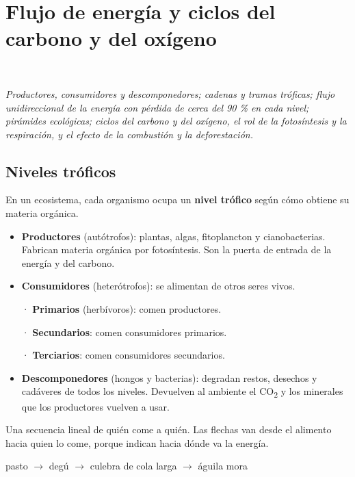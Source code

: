 \section[Flujo de energía y ciclos del carbono y del oxígeno]{Flujo de energía y ciclos del carbono y del oxígeno}
\modcomun\ \ {\color{gris}\itshape Productores, consumidores y descomponedores; cadenas y tramas tróficas; flujo unidireccional de la energía con pérdida de cerca del 90 \% en cada nivel; pirámides ecológicas; ciclos del carbono y del oxígeno, el rol de la fotosíntesis y la respiración, y el efecto de la combustión y la deforestación.\par}
\subsection{Niveles tróficos}
En un ecosistema, cada organismo ocupa un \textbf{nivel trófico} según cómo obtiene su materia orgánica.

 
\begin{itemize}
  \item \textbf{Productores} (autótrofos): plantas, algas, fitoplancton y cianobacterias. Fabrican materia orgánica por fotosíntesis. Son la puerta de entrada de la energía y del carbono.
  \item \textbf{Consumidores} (heterótrofos): se alimentan de otros seres vivos.\par · \textbf{Primarios} (herbívoros): comen productores.\par · \textbf{Secundarios}: comen consumidores primarios.\par · \textbf{Terciarios}: comen consumidores secundarios.
  \item \textbf{Descomponedores} (hongos y bacterias): degradan restos, desechos y cadáveres de todos los niveles. Devuelven al ambiente el CO\textsubscript{2} y los minerales que los productores vuelven a usar.
\end{itemize}
  
\begin{clave} Una secuencia lineal de quién come a quién. Las flechas van desde el alimento hacia quien lo come, porque indican hacia dónde va la energía.\par pasto \ensuremath{\rightarrow} degú \ensuremath{\rightarrow} culebra de cola larga \ensuremath{\rightarrow} águila mora\end{clave}
 
